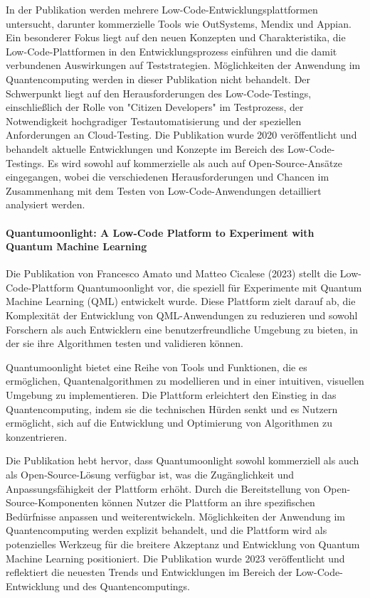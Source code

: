 In der Publikation werden mehrere Low-Code-Entwicklungsplattformen untersucht, darunter kommerzielle Tools wie OutSystems, 
Mendix und Appian. Ein besonderer Fokus liegt auf den neuen Konzepten und Charakteristika, die Low-Code-Plattformen in 
den Entwicklungsprozess einführen und die damit verbundenen Auswirkungen auf Teststrategien. Möglichkeiten der Anwendung 
im Quantencomputing werden in dieser Publikation nicht behandelt. Der Schwerpunkt liegt auf den Herausforderungen 
des Low-Code-Testings, einschließlich der Rolle von "Citizen Developers" im Testprozess, der Notwendigkeit hochgradiger 
Testautomatisierung und der speziellen Anforderungen an Cloud-Testing. Die Publikation wurde 2020 veröffentlicht und 
behandelt aktuelle Entwicklungen und Konzepte im Bereich des Low-Code-Testings. Es wird sowohl auf kommerzielle als 
auch auf Open-Source-Ansätze eingegangen, wobei die verschiedenen Herausforderungen und Chancen im Zusammenhang mit 
dem Testen von Low-Code-Anwendungen detailliert analysiert werden.

\paragraph{Quantumoonlight: A Low-Code Platform to Experiment with Quantum Machine Learning}

Die Publikation von Francesco Amato und Matteo Cicalese (2023) \cite{Amato_2023} stellt die Low-Code-Plattform Quantumoonlight vor, 
die speziell für Experimente mit Quantum Machine Learning (QML) entwickelt wurde. Diese Plattform zielt darauf ab, 
die Komplexität der Entwicklung von QML-Anwendungen zu reduzieren und sowohl Forschern als auch Entwicklern eine 
benutzerfreundliche Umgebung zu bieten, in der sie ihre Algorithmen testen und validieren können.

Quantumoonlight bietet eine Reihe von Tools und Funktionen, die es ermöglichen, Quantenalgorithmen zu modellieren und in 
einer intuitiven, visuellen Umgebung zu implementieren. Die Plattform erleichtert den Einstieg in das Quantencomputing, 
indem sie die technischen Hürden senkt und es Nutzern ermöglicht, sich auf die Entwicklung und Optimierung von Algorithmen zu konzentrieren. 

Die Publikation hebt hervor, dass Quantumoonlight sowohl kommerziell als auch als Open-Source-Lösung verfügbar ist, 
was die Zugänglichkeit und Anpassungsfähigkeit der Plattform erhöht. Durch die Bereitstellung von Open-Source-Komponenten 
können Nutzer die Plattform an ihre spezifischen Bedürfnisse anpassen und weiterentwickeln. Möglichkeiten der 
Anwendung im Quantencomputing werden explizit behandelt, und die Plattform wird als potenzielles Werkzeug 
für die breitere Akzeptanz und Entwicklung von Quantum Machine Learning positioniert. Die Publikation wurde 2023 
veröffentlicht und reflektiert die neuesten Trends und Entwicklungen im Bereich der Low-Code-Entwicklung und des Quantencomputings.

